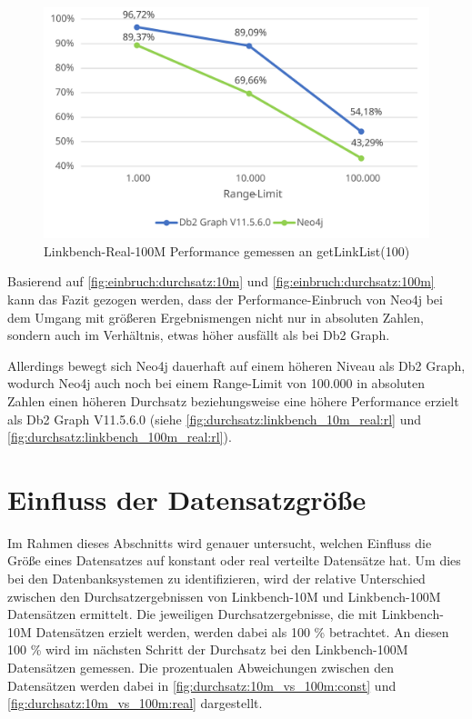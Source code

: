 \begin{figure}[!ht]
    \centering
    \includegraphics[width=\textwidth]{images/diagramme/limit_relative_durchsatz_real_100m.pdf}
    \caption{Linkbench-Real-100M Performance gemessen an getLinkList(100)}
    \label{fig:einbruch:durchsatz:100m}
\end{figure}

Basierend auf \autoref{fig:einbruch:durchsatz:10m} und \autoref{fig:einbruch:durchsatz:100m} kann das Fazit gezogen werden, dass der Performance-Einbruch von Neo4j bei dem Umgang mit größeren Ergebnismengen nicht nur in absoluten Zahlen, sondern auch im Verhältnis, etwas höher ausfällt als bei Db2 Graph. 

Allerdings bewegt sich Neo4j dauerhaft auf einem höheren Niveau als Db2 Graph, wodurch Neo4j auch noch bei einem Range-Limit von 100.000 in absoluten Zahlen einen höheren Durchsatz beziehungsweise eine höhere Performance erzielt als Db2 Graph V11.5.6.0 (siehe \autoref{fig:durchsatz:linkbench_10m_real:rl} und \autoref{fig:durchsatz:linkbench_100m_real:rl}).

\section{Einfluss der Datensatzgröße}
\label{auswertung:groesse}
Im Rahmen dieses Abschnitts wird genauer untersucht, welchen Einfluss die Größe eines Datensatzes auf konstant oder real verteilte Datensätze hat. Um dies bei den Datenbanksystemen zu identifizieren, wird der relative Unterschied zwischen den Durchsatzergebnissen von Linkbench-10M und Linkbench-100M Datensätzen ermittelt. Die jeweiligen Durchsatzergebnisse, die mit Linkbench-10M Datensätzen erzielt werden, werden dabei als 100 \% betrachtet. An diesen 100 \% wird im nächsten Schritt der Durchsatz bei den Linkbench-100M Datensätzen gemessen. Die prozentualen Abweichungen zwischen den Datensätzen werden dabei in \autoref{fig:durchsatz:10m_vs_100m:const} und \autoref{fig:durchsatz:10m_vs_100m:real} dargestellt.

